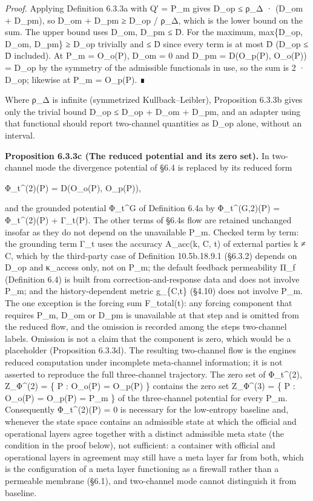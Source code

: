 \documentclass[
]{article}
\begin{document}
\emph{Proof.} Applying Definition 6.3.3a with Q′ = P\_m gives D\_op ≤
ρ\_Δ · (D\_om + D\_pm), so D\_om + D\_pm ≥ D\_op / ρ\_Δ, which is the
lower bound on the sum. The upper bound uses D\_om, D\_pm ≤ D̄. For the
maximum, max\{D\_op, D\_om, D\_pm\} ≥ D\_op trivially and ≤ D̄ since
every term is at most D̄ (D\_op ≤ D̄ included). At P\_m = O\_o(P), D\_om =
0 and D\_pm = D(O\_p(P), O\_o(P)) = D\_op by the symmetry of the
admissible functionals in use, so the sum is 2 · D\_op; likewise at P\_m
= O\_p(P). ∎

Where ρ\_Δ is infinite (symmetrized Kullback--Leibler), Proposition
6.3.3b gives only the trivial bound D\_op ≤ D\_op + D\_om + D\_pm, and
an adapter using that functional should report two-channel quantities as
D\_op alone, without an interval.

\textbf{Proposition 6.3.3c (The reduced potential and its zero set).} In
two-channel mode the divergence potential of §6.4 is replaced by its
reduced form

Φ\_t\^{}(2)(P) = D(O\_o(P), O\_p(P)),

and the grounded potential Φ\_t\^{}G of Definition 6.4a by
Φ\_t\^{}(G,2)(P) = Φ\_t\^{}(2)(P) + Γ\_t(P). The other terms of
§6.4\textquotesingle s flow are retained unchanged insofar as they do
not depend on the unavailable P\_m. Checked term by term: the grounding
term Γ\_t uses the accuracy A\_acc(k, C, t) of external parties k ≠ C,
which by the third-party case of Definition 10.5b.18.9.1 (§6.3.2)
depends on D\_op and κ\_access only, not on P\_m; the default feedback
permeability Π\_f (Definition 6.4) is built from correction-and-response
data and does not involve P\_m; and the history-dependent metric
g\_\{C,t\} (§4.10) does not involve P\_m. The one exception is the
forcing sum F\_total(t): any forcing component that requires P\_m, D\_om
or D\_pm is unavailable at that step and is omitted from the reduced
flow, and the omission is recorded among the step\textquotesingle s
two-channel labels. Omission is not a claim that the component is zero,
which would be a placeholder (Proposition 6.3.3d). The resulting
two-channel flow is the engine\textquotesingle s reduced computation
under incomplete meta-channel information; it is not asserted to
reproduce the full three-channel trajectory. The zero set of
Φ\_t\^{}(2), Z\_Φ\^{}(2) = \{ P : O\_o(P) = O\_p(P) \} contains the zero
set Z\_Φ\^{}(3) = \{ P : O\_o(P) = O\_p(P) = P\_m \} of the
three-channel potential for every P\_m. Consequently Φ\_t\^{}(2)(P) = 0
is necessary for the low-entropy baseline and, whenever the state space
contains an admissible state at which the official and operational
layers agree together with a distinct admissible meta state (the
condition in the proof below), not sufficient: a container with official
and operational layers in agreement may still have a meta layer far from
both, which is the configuration of a meta layer functioning as a
firewall rather than a permeable membrane (§6.1), and two-channel mode
cannot distinguish it from baseline.
\end{document}
